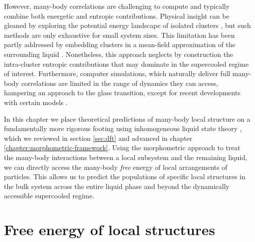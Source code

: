 \documentclass[11pt,twoside]{report}
\begin{document}
However, many-body correlations are challenging to compute and typically combine both energetic and entropic contributions.
Physical insight can be gleaned by exploring the potential energy landscape of isolated clusters \cite{Wales2004,ArkusPRL2009}, but such methods are only exhaustive for small system sizes.
This limitation has been partly addressed by embedding clusters in a mean-field approximation of the surrounding liquid \cite{MossaJCP2003,MossaJNS2006}.
Nonetheless, this approach neglects by construction the intra-cluster entropic contributions that may dominate in the supercooled regime of interest.
Furthermore, computer simulations, which naturally deliver full many-body correlations are limited in the range of dynamics they can access, hampering an approach to the glass transition, except for recent developments with certain models \cite{BerthierPRL2016}.

In this chapter we place theoretical predictions of many-body local structure on a fundamentally more rigorous footing using inhomogeneous liquid state theory \cite{EvansAP1979}, which we reviewed in section \ref{sec:dft} and advanced in chapter \ref{chapter:morphometric-framework}.
Using the morphometric approach to treat the many-body interactions between a local subsystem and the remaining liquid, we can directly access the many-body \textit{free} energy of local arrangements of particles.
This allows us to predict the populations of specific local structures in the bulk system across the entire liquid phase and beyond the dynamically accessible supercooled regime.

\section{Free energy of local structures}


\end{document}
